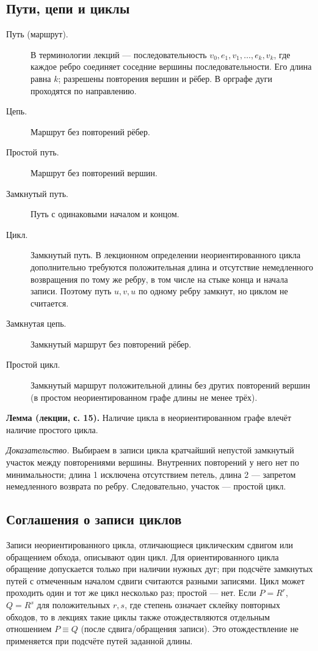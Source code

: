 \subsection*{Пути, цепи и циклы}
\begin{description}
\item[Путь (маршрут).] В терминологии лекций — последовательность \(v_0,e_1,v_1,\ldots,e_k,v_k\),
где каждое ребро соединяет соседние вершины последовательности.
Его длина равна \(k\); разрешены повторения вершин и рёбер.
В орграфе дуги проходятся по направлению.
\item[Цепь.] Маршрут без повторений рёбер.
\item[Простой путь.] Маршрут без повторений вершин.
\item[Замкнутый путь.] Путь с одинаковыми началом и концом.
\item[Цикл.] Замкнутый путь. В лекционном определении неориентированного цикла дополнительно
требуются положительная длина и отсутствие немедленного возвращения
по тому же ребру, в том числе на стыке конца и начала записи.
Поэтому путь \(u,v,u\) по одному ребру замкнут, но циклом не считается.
\item[Замкнутая цепь.] Замкнутый маршрут без повторений рёбер.
\item[Простой цикл.] Замкнутый маршрут положительной длины без других
повторений вершин (в простом неориентированном графе длины не менее трёх).
\end{description}



\begin{tcolorbox}[colback=cbBlueBack,colframe=cbGray!55,
  borderline west={1.6pt}{0pt}{cbBlue}]
\textbf{Лемма (лекции, с. 15).} Наличие цикла в неориентированном графе
влечёт наличие простого цикла.
\end{tcolorbox}
\textit{Доказательство.} Выбираем в записи цикла кратчайший
непустой замкнутый участок между повторениями вершины. Внутренних
повторений у него нет по минимальности; длина 1 исключена отсутствием
петель, длина 2 — запретом немедленного возврата по ребру.
Следовательно, участок — простой цикл.


\clearpage
\subsection*{Соглашения о записи циклов}

Записи неориентированного цикла, отличающиеся циклическим сдвигом
или обращением обхода, описывают один цикл. Для ориентированного цикла
обращение допускается только при наличии нужных дуг; при подсчёте замкнутых
путей с отмеченным началом сдвиги считаются разными записями.
Цикл может проходить один и тот же цикл несколько раз; простой — нет.
Если \(P=R^r\), \(Q=R^s\) для положительных \(r,s\), где степень означает
склейку повторных обходов, то в лекциях такие циклы также отождествляются
отдельным отношением \(P\equiv Q\) (после сдвига/обращения записи).
Это отождествление не применяется при подсчёте путей заданной длины.

